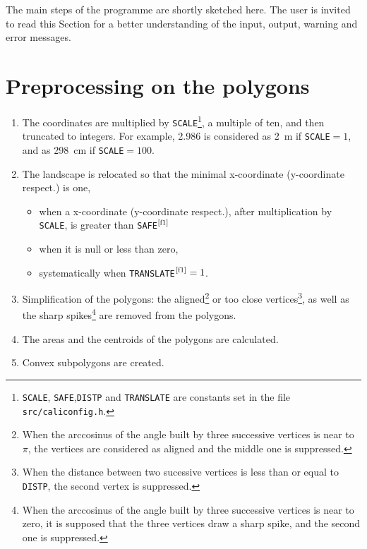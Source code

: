 


\label{programme:does}
The main steps of the programme are shortly sketched here.
The user is invited to read this Section for a better understanding
of the input, output, warning  and error messages.


\section{Preprocessing on the polygons}
\label{Preprocessing}
\begin{enumerate}
\item
The coordinates
are multiplied by \texttt{SCALE}\footnote{\label{f1}\texttt{SCALE},
\texttt{SAFE},\texttt{DISTP} and \texttt{TRANSLATE}
are constants set in the file \texttt{src/caliconfig.h}.},
a multiple of ten, and then  truncated to integers.
For example, 2.986 is considered as 2~m if \texttt{SCALE}$=1$,
and as 298~cm if \texttt{SCALE}$=100$.


\item
The landscape is relocated
so that the minimal x-coordinate (y-coordinate respect.)
is one,
\begin{itemize}
\item
 when 
a x-coordinate (y-coordinate respect.),
after multiplication by \texttt{SCALE},
is greater than 
\texttt{SAFE}$^\text{\ref{f1}}$
\item
when it is null or less than zero,
\item
 systematically when
\texttt{TRANSLATE}$^\text{\ref{f1}} = 1$.

\end{itemize}
\item
\label{supvertice}
Simplification of the polygons:
the aligned\footnote{
When the arccosinus of the angle built by 
three successive  vertices
is near to $\pi$,
 the vertices are considered as aligned and the middle one is
 suppressed.}
or too close vertices\footnote{
When the distance between two sucessive vertices is less
than or equal to \texttt{DISTP}, the second vertex is suppressed.},
 as well as the sharp spikes\footnote{
When the arccosinus of the angle built by 
three successive  vertices
is near to zero, it is supposed that
the three vertices draw a sharp spike,  and the second one is suppressed.}
are removed from the polygons.

\item
The areas and the centroids of the polygons are calculated.

\item
Convex subpolygons are created.
\end{enumerate}






